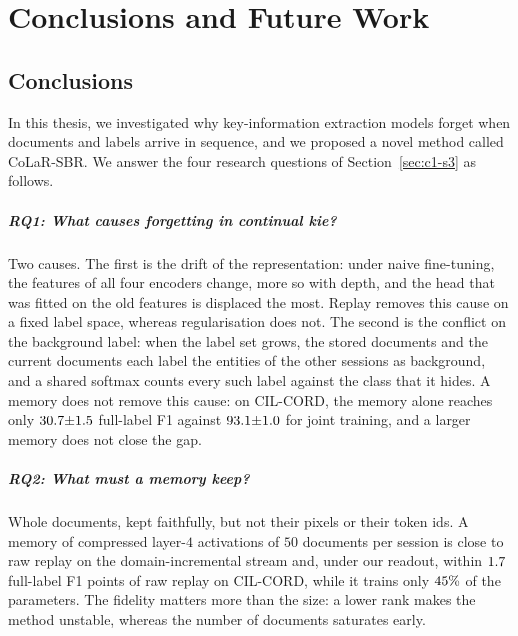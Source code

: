 \chapter{Conclusions and Future Work}
\label{ch:conclusion}

\section{Conclusions}
\label{sec:c7-s1}

In this thesis, we investigated why key-information extraction models forget when
documents and labels arrive in sequence, and we proposed a novel method called CoLaR-SBR.
We answer the four research questions of Section~\ref{sec:c1-s3} as follows.

\paragraph{RQ1: What causes forgetting in continual \gls{kie}?} Two causes. The first is
the drift of the representation: under naive fine-tuning, the features of all four
encoders change, more so with depth, and the head that was fitted on the old features is
displaced the most. Replay removes this cause on a fixed label space, whereas
regularisation does not. The second is the conflict on the background label: when the
label set grows, the stored documents and the current documents each label the entities
of the other sessions as background, and a shared softmax counts every such label against
the class that it hides. A memory does not remove this cause: on CIL-CORD, the memory
alone reaches only $30.7{\pm}1.5$ full-label F1 against $93.1{\pm}1.0$ for joint training,
and a larger memory does not close the gap.

\paragraph{RQ2: What must a memory keep?} Whole documents, kept faithfully, but not their
pixels or their token ids. A memory of compressed layer-$4$ activations of $50$ documents
per session is close to raw replay on the domain-incremental stream and, under our
readout, within $1.7$ full-label F1 points of raw replay on CIL-CORD, while
it trains only $45\%$ of the parameters. The fidelity matters more than the
size: a lower rank makes the method unstable, whereas the number of documents saturates
early.

